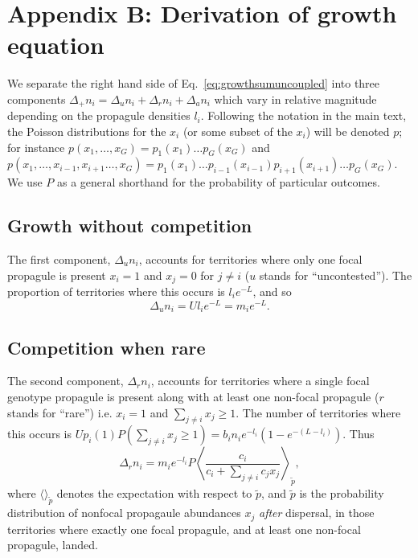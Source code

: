 \documentclass[11pt]{article}
\begin{document}
\section*{Appendix B: Derivation of growth equation}

We separate the right hand side of Eq.~\eqref{eq:growthsumuncoupled} into three components $\Delta_+ n_i = \Delta_u n_i+\Delta_r n_i+\Delta_a n_i$ which vary in relative magnitude depending on the propagule densities $l_i$. Following the notation in the main text, the Poisson distributions for the $x_i$ (or some subset of the $x_i$) will be denoted $p$; for instance $p(x_1,\ldots,x_G)=p_1(x_1)\ldots p_G(x_G)$ and $p(x_1,\ldots,x_{i-1},x_{i+1}\ldots,x_G)=p_1(x_1)\ldots p_{i-1}(x_{i-1})p_{i+1}(x_{i+1})\ldots p_G(x_G)$. We use $P$ as a general shorthand for the probability of particular outcomes.

\subsection*{Growth without competition}

The first component, $\Delta_u n_i$, accounts for territories where only one focal propagule is present $x_i=1$ and $x_j=0$ for $j\neq i$ ($u$ stands for ``uncontested''). The proportion of territories where this occurs is $l_i e^{-L}$, and so 
\begin{equation}
\Delta_u n_i=Ul_i e^{-L}=m_i e^{-L}.
\end{equation}

\subsection*{Competition when rare}

The second component, $\Delta_r n_i$, accounts for territories where a single focal genotype propagule is present along with at least one non-focal propagule ($r$ stands for ``rare'') i.e. $x_i=1$ and $\sum_{j\neq i} x_j\geq 1$. The number of territories where this occurs is $Up_i(1)P(\sum_{j\neq i} x_j\geq 1)=b_i n_i e^{-l_i}(1-e^{-(L-l_i)})$. Thus 
\begin{equation}
\Delta_r n_i = m_i e^{-l_i}P\left\langle  \frac{c_i}{c_i +\sum_{j\neq i} c_j x_j } \right\rangle_{\tilde{p}},  \label{eq:deltr}
\end{equation}
where $\langle \rangle_{\tilde{p}}$ denotes the expectation with respect to $\tilde{p}$, and $\tilde{p}$ is the probability distribution of nonfocal propagaule abundances $x_j$ \textit{after} dispersal, in those territories where exactly one focal propagule, and at least one non-focal propagule, landed. 
\end{document}
